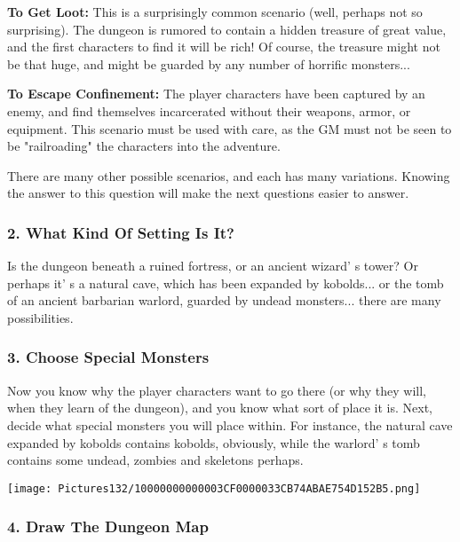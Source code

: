 \documentclass[a4paper,twoside,openany,10pt]{book}
\begin{document}
\begin{multicols}{2}
\textbf{To Get Loot:} This is a surprisingly common scenario (well, perhaps not so surprising). The dungeon is rumored to contain a hidden treasure of great value, and the first characters to find it will be rich! Of course, the treasure might not be that huge, and might be guarded by any number of horrific monsters...

\textbf{To Escape Confinement:} The player characters have been captured by an enemy, and find themselves incarcerated without their weapons, armor, or equipment. This scenario must be used with care, as the GM must not be seen to be "railroading" the characters into the adventure. 

There are many other possible scenarios, and each has many variations. Knowing the answer to this question will make the next questions easier to answer.

\subsubsection{2. What Kind Of Setting Is It?}\label{what-kind-of-setting-is-it}

Is the dungeon beneath a ruined fortress, or an ancient wizard' s tower? Or perhaps it' s a natural cave, which has been expanded by kobolds... or the tomb of an ancient barbarian warlord, guarded by undead monsters... there are many possibilities.

\subsubsection{3. Choose Special Monsters}\label{choose-special-monsters}

Now you know why the player characters want to go there (or why they will, when they learn of the dungeon), and you know what sort of place it is. Next, decide what special monsters you will place within. For instance, the natural cave expanded by kobolds contains kobolds, obviously, while the warlord' s tomb contains some undead, zombies and skeletons perhaps.

\begin{center}
	\texttt{[image: Pictures132/10000000000003CF0000033CB74ABAE754D152B5.png]}
\end{center}

\subsubsection{4. Draw The Dungeon Map}\label{draw-the-dungeon-map}


\end{multicols}
\end{document}
